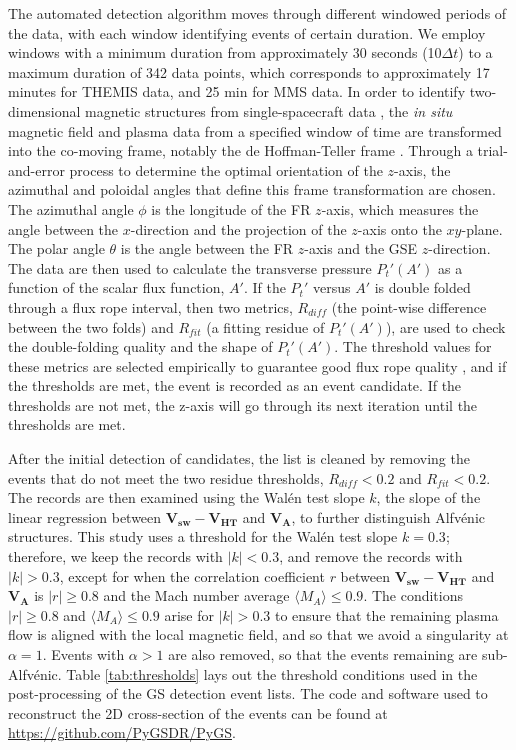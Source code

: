 The automated detection algorithm moves through different windowed periods of the data, with each window identifying events of certain duration. We employ windows with a minimum duration from approximately 30 seconds (10$\Delta t$) to a maximum duration of 342 data points, which corresponds to approximately 17 minutes for THEMIS data, and 25 min for MMS data. In order to identify two-dimensional magnetic structures from single-spacecraft data \cite{Paschmann:2008}, the \textit{in situ} magnetic field and plasma data from a specified window of time are transformed into the co-moving frame, notably the de Hoffman-Teller frame \cite{deHoffman-Teller:1950}. Through a trial-and-error process to determine the optimal orientation of the $z$-axis, the azimuthal and poloidal angles that define this frame transformation are chosen. The azimuthal angle $\phi$ is the longitude of the FR $z$-axis, which measures the angle between the $x$-direction and the projection of the $z$-axis onto the $xy$-plane. The polar angle $\theta$ is the angle between the FR $z$-axis and the GSE $z$-direction. %
The data are then used to calculate the transverse pressure $P_t'(A')$ as a function of the scalar flux function, $A'$. If the $P_t'$ versus $A'$ is double folded through a flux rope interval, then two metrics, $R_{diff}$ (the point-wise difference between the two folds) and $R_{fit}$ (a fitting residue of $P_t'(A')$), are used to check the double-folding quality and the shape of $P_t'(A')$. The threshold values for these metrics are selected empirically to guarantee good flux rope quality \cite{Hu:2018}, and if the thresholds are met, the event is recorded as an event candidate. If the thresholds are not met, the z-axis will go through its next iteration until the thresholds are met.

After the initial detection of candidates, the list is cleaned by removing the events that do not meet the two residue thresholds, $R_{diff}<0.2$ and $R_{fit}<0.2$. The records are then examined using the Wal\'en test slope $k$, the slope of the linear regression between $\mathbf{V_{sw}} - \mathbf{V_{HT}}$ and $\mathbf{V_A}$, to further distinguish Alfv\'enic structures. This study uses a threshold for the Wal\'en test slope $k=0.3$; therefore, we keep the records with $|k|<0.3$, and remove the records with $|k|>0.3$, except for when the correlation coefficient $r$ between $\mathbf{V_{sw}} - \mathbf{V_{HT}}$ and $\mathbf{V_A}$ is $|r|\geq 0.8$ and the Mach number average $\langle M_A\rangle \leq 0.9$. The conditions $|r|\geq 0.8$ and $\langle M_A\rangle \leq 0.9$ arise for $|k|>0.3$ to ensure that the remaining plasma flow is aligned with the local magnetic field, and so that we avoid a singularity at $\alpha=1$. Events with $\alpha>1$ are also removed, so that the events remaining are sub-Alfv\'enic. Table \ref{tab:thresholds} lays out the threshold conditions used in the post-processing of the GS detection event lists. The code and software used to reconstruct the 2D cross-section of the events can be found at \url{https://github.com/PyGSDR/PyGS}.


